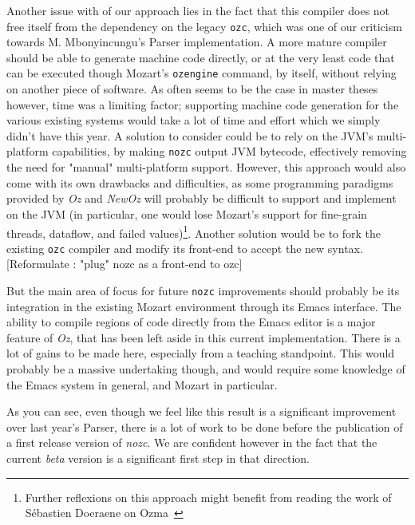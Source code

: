 Another issue with of our approach lies in the fact that this compiler does not free itself from the dependency on the legacy \texttt{ozc}, which was one of our criticism towards M. Mbonyincungu's Parser implementation.
A more mature compiler should be able to generate machine code directly, or at the very least code that can be executed though Mozart's \texttt{ozengine} command, by itself, without relying on another piece of software.
As often seems to be the case in master theses however, time was a limiting factor;
supporting machine code generation for the various existing systems would take a lot of time and effort which we simply didn't have this year.\newline
A solution to consider could be to rely on the JVM's multi-platform capabilities, by making \texttt{nozc} output JVM bytecode, effectively removing the need for  "manual" multi-platform support.
However, this approach would also come with its own drawbacks and difficulties, as some programming paradigms provided by \textit{Oz} and \textit{NewOz} will probably be difficult to support and implement on the JVM (in particular, one would lose Mozart's support for fine-grain threads, dataflow, and failed values)\footnote{Further reflexions on this approach might benefit from reading the work of Sébastien Doeraene on Ozma~\cite{Ozma}}.\newline
Another solution would be to fork the existing \texttt{ozc} compiler and modify its front-end to accept the new syntax.[Reformulate : "plug" nozc as a front-end to ozc]\newline

But the main area of focus for future \texttt{nozc} improvements should probably be its integration in the existing Mozart environment through its Emacs interface.
The ability to compile regions of code directly from the Emacs editor is a major feature of \textit{Oz}, that has been left aside in this current implementation.
There is a lot of gains to be made here, especially from a teaching standpoint.
This would probably be a massive undertaking though, and would require some knowledge of the Emacs system in general, and Mozart in particular.\newline

As you can see, even though we feel like this result is a significant improvement over last year's Parser, there is a lot of work to be done before the publication of a first release version of \textit{nozc}.
We are confident however in the fact that the current \textit{beta} version is a significant first step in that direction.